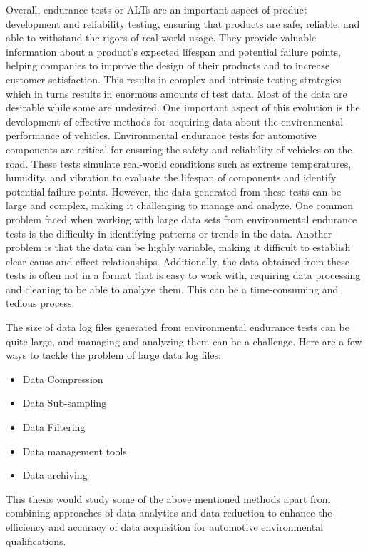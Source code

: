 Overall, endurance tests or ALTs are an important aspect of product development and reliability testing, ensuring that products are safe, reliable, and able to withstand the rigors of real-world usage. They provide valuable information about a product's expected lifespan and potential failure points, helping companies to improve the design of their products and to increase customer satisfaction. This results in complex and intrinsic testing strategies which in turns results in enormous amounts of test data. Most of the data are desirable while some are undesired. One important aspect of this evolution is the development of effective methods for acquiring data about the environmental performance of vehicles. Environmental endurance tests for automotive components are critical for ensuring the safety and reliability of vehicles on the road. These tests simulate real-world conditions such as extreme temperatures, humidity, and vibration to evaluate the lifespan of components and identify potential failure points. However, the data generated from these tests can be large and complex, making it challenging to manage and analyze. One common problem faced when working with large data sets from environmental endurance tests is the difficulty in identifying patterns or trends in the data. Another problem is that the data can be highly variable, making it difficult to establish clear cause-and-effect relationships. Additionally, the data obtained from these tests is often not in a format that is easy to work with, requiring data processing and cleaning to be able to analyze them. This can be a time-consuming and tedious process.

The size of data log files generated from environmental endurance tests can be quite large, and managing and analyzing them can be a challenge. Here are a few ways to tackle the problem of large data log files:

\begin{itemize}
    \item Data Compression
    \item Data Sub-sampling
    \item Data Filtering
    \item Data management tools
    \item Data archiving
\end{itemize}

This thesis would study some of the above mentioned methods apart from combining approaches of data analytics and data reduction to enhance the efficiency and accuracy of data acquisition for automotive environmental qualifications.

